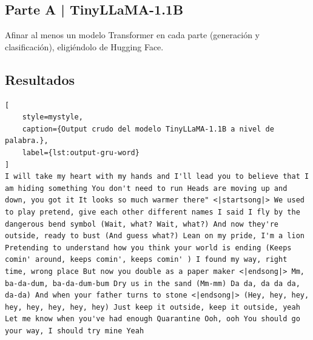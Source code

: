 \newpage

\begin{myblock}
\section*{Parte A | TinyLLaMA-1.1B}

    Afinar al menos un modelo Transformer en cada parte (generación y clasificación), eligiéndolo
    de Hugging Face. 

\end{myblock}





\subsection{Resultados}

\begin{lstlisting}[
    style=mystyle,
    caption={Output crudo del modelo TinyLLaMA-1.1B a nivel de palabra.},
    label={lst:output-gru-word}
]
I will take my heart with my hands and I'll lead you to believe that I am hiding something You don't need to run Heads are moving up and down, you got it It looks so much warmer there" <|startsong|> We used to play pretend, give each other different names I said I fly by the dangerous bend symbol (Wait, what? Wait, what?) And now they're outside, ready to bust (And guess what?) Lean on my pride, I'm a lion Pretending to understand how you think your world is ending (Keeps comin' around, keeps comin', keeps comin' ) I found my way, right time, wrong place But now you double as a paper maker <|endsong|> Mm, ba-da-dum, ba-da-dum-bum Dry us in the sand (Mm-mm) Da da, da da da, da-da) And when your father turns to stone <|endsong|> (Hey, hey, hey, hey, hey, hey, hey, hey) Just keep it outside, keep it outside, yeah Let me know when you've had enough Quarantine Ooh, ooh You should go your way, I should try mine Yeah\end{lstlisting}
\clearpage

